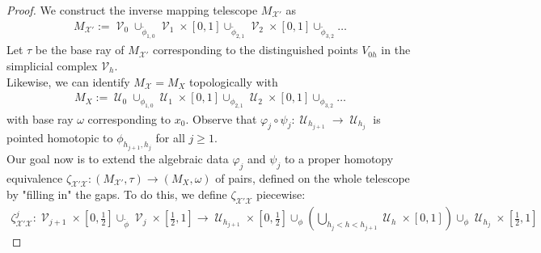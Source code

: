 \documentclass[a4paper,11pt]{article}
\theoremstyle{definition}
\theoremstyle{plain}
\theoremstyle{remark}
\DeclareMathOperator{\V}{\mathcal{V}}
\DeclareMathOperator{\U}{\mathcal{U}}
\begin{document}
{\begin{proof}
We construct the inverse mapping telescope  $M_{\mathcal{X}'}$ as
\begin{align*}
M_{\mathcal{X}'}:= \V_{0} \cup_{\tilde{\phi}_{1,0}} \V_{1} \times [0,1] \cup_{\tilde{\phi}_{2,1}} \V_{2} \times [0,1] \cup_{\tilde{\phi}_{3,2}} \dots 
\end{align*}
Let $\tau$ be the base ray of $M_{\mathcal{X}'}$ corresponding to the distinguished points $V_{0h}$ in the simplicial complex $\mathcal{V}_{h}$. \\

Likewise, we can identify $M_{\mathcal{X}}=M_{X}$ topologically with 
\begin{align*}
M_{X}:= \U_{0} \cup_{{\phi}_{1,0}} \U_{1} \times [0,1] \cup_{{\phi}_{2,1}} \U_{2} \times [0,1] \cup_{{\phi}_{3,2}} \dots
\end{align*}
with base ray $\omega$ corresponding to $x_0$. Observe that $\varphi_j\circ \psi_{j}: \U_{h_{j+1}}\rightarrow \U_{h_{j}}$ is pointed homotopic to $\phi_{h_{j+1}, h_{j}}$ for all $j\geq 1$. \\

Our goal now is to extend the algebraic data $\varphi_{j}$ and $\psi_{j}$ to a proper homotopy equivalence $\zeta_{\mathcal{X}'\mathcal{X}}: (M_{\mathcal{X}'},\tau) \rightarrow (M_X,\omega)$ of pairs, defined on the whole telescope by "filling in" the gaps. To do this, we define $\zeta_{\mathcal{X}'\mathcal{X}}$ piecewise:
\begin{align*}
\zeta^{j}_{\mathcal{X}'\mathcal{X}}: \V_{j+1} \times [0,\frac{1}{2}]\cup_{\tilde{\phi}} \V_{j} \times [\frac{1}{2},1] \longrightarrow \U_{h_{j+1}} \times [0,\frac{1}{2}] \cup_{\phi} (\bigcup_{h_{j}<h<h_{j+1}} \U_{h} \times [0,1]) \cup_{\phi} \U_{h_j} \times [\frac{1}{2},1] 
\end{align*}


\end{proof}}
\end{document}
